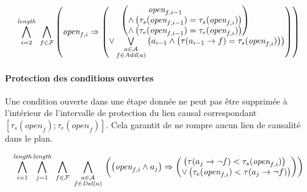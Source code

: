 \begin{small}
\[
\BigforallTwo{i=2}{\length}~\Bigforall{\substack{\f\in \F}}%
\begin{pmatrix}\open{\f}{i} \Rightarrow%
\begin{pmatrix}\begin{pmatrix}\open{\f}{i-1}\hfill\\ \wedge %
\left(\tau_{s}(\open{\f}{i-1}) = \tau_{s}(\open{\f}{i})\right)\hfill\\
 \wedge \left(\tau_{e}(\open{\f}{i-1}) = \tau_{e}(\open{\f}{i})
 \right)\end{pmatrix}\hfill\\
 \vee \bigvee\limits_{\substack{\a\in \A\\\f \in \add{\a}}}\left(\a_{i - 1} \wedge \left(\tau(\a_{i - 1}\rightarrow \f) = \tau_{s}(\open{\f}{i})\right)\right)\hfill\\
 \end{pmatrix}\end{pmatrix}%
\]
\end{small}


\paragraph*{Protection des conditions ouvertes}

Une condition ouverte dans une étape donnée ne peut pas être supprimée à l'intérieur de l'intervalle de protection du lien causal correspondant $[\tau_{s}(\textit{open}_{f});\tau_{e}(\textit{open}_{f})]$. Cela garantit de ne rompre aucun lien de causalité dans le plan.

\begin{small}
\[
\BigforallTwo{i=1}{\length}\BigforallTwo{j=1}{\length}%
~\Bigforall{\substack{\f\in \F}}~\Bigforall{\substack{\a\in \A\\\f \in \del{\a}}}\hfill\\
\left(\left(\open{\f}{i} \wedge \a_{j}\right) \Rightarrow \begin{pmatrix}\left(\tau(\a_{j}\rightarrow \neg \f) < \tau_{s}(\open{\f}{i})\right)\hfill\\
 \vee \left(\tau_{e}(\open{\f}{i}) < \tau(\a_j\rightarrow \neg \f)\right)\end{pmatrix}\right)%
\]
\end{small}


